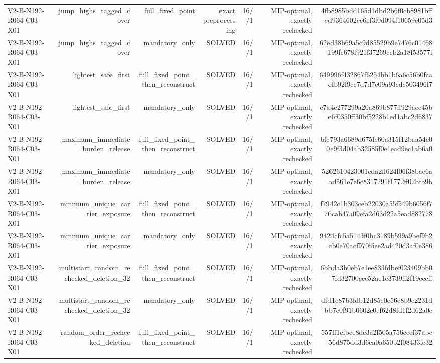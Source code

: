 {\begin{longtable}{lrrrrrr}
V2-B-N192-R064-C03-X01 & jump\_highs\_tagged\_cover & full\_fixed\_point & exact preprocessing & 16//1 & MIP-optimal, exactly rechecked & 4fb8985bdd165d1dbd2b6f0cb8981bffed9364602ce6ef3f0d094f10659e05d3 \\
V2-B-N192-R064-C03-X01 & jump\_highs\_tagged\_cover & mandatory\_only & SOLVED & 16//1 & MIP-optimal, exactly rechecked & 62ed38b69a5c9d85529b9e7476c01468199fc678f921f37269ccb2a18f53577f \\
V2-B-N192-R064-C03-X01 & lightest\_safe\_first & full\_fixed\_point\_then\_reconstruct & SOLVED & 16//1 & MIP-optimal, exactly rechecked & 649996f432867f6254bb1b6a6c56b0fcacfb92f9cc7d7d7e09a93cdc503496f7 \\
V2-B-N192-R064-C03-X01 & lightest\_safe\_first & mandatory\_only & SOLVED & 16//1 & MIP-optimal, exactly rechecked & c7a4c277299a20a869b877ff929aee45be6f0350ff30bf5228b1ed1abc2d6837 \\
V2-B-N192-R064-C03-X01 & maximum\_immediate\_burden\_release & full\_fixed\_point\_then\_reconstruct & SOLVED & 16//1 & MIP-optimal, exactly rechecked & bfc793a6689d675fc60a315f12baa54c00e9f3d04ab32585f0e1ead9ec1ab6a0 \\
V2-B-N192-R064-C03-X01 & maximum\_immediate\_burden\_release & mandatory\_only & SOLVED & 16//1 & MIP-optimal, exactly rechecked & 5262610423001eda2ff624f06f38bac6aad561e7e6c8317291f1772ff02bfb9b \\
V2-B-N192-R064-C03-X01 & minimum\_unique\_carrier\_exposure & full\_fixed\_point\_then\_reconstruct & SOLVED & 16//1 & MIP-optimal, exactly rechecked & f7942c1b303ceb22030a55f549b6056f776cab47a09efa2d63d22a5ead882778 \\
V2-B-N192-R064-C03-X01 & minimum\_unique\_carrier\_exposure & mandatory\_only & SOLVED & 16//1 & MIP-optimal, exactly rechecked & 9424cfc5a5143f0bc3189b599a9bef9b2cb0e70acf970f5ee2ad420d3af0e386 \\
V2-B-N192-R064-C03-X01 & multistart\_random\_rechecked\_deletion\_32 & full\_fixed\_point\_then\_reconstruct & SOLVED & 16//1 & MIP-optimal, exactly rechecked & 6bbda3b0eb7e1ee833fdbef023409bb07fd32700ccc52ae1e3739ff2f19eccff \\
V2-B-N192-R064-C03-X01 & multistart\_random\_rechecked\_deletion\_32 & mandatory\_only & SOLVED & 16//1 & MIP-optimal, exactly rechecked & dfd1e87b3fdb12d85e0e56e8b9e2231dbb7c0f91b0602e0ef62d8fd1f2d62a0e \\
V2-B-N192-R064-C03-X01 & random\_order\_rechecked\_deletion & full\_fixed\_point\_then\_reconstruct & SOLVED & 16//1 & MIP-optimal, exactly rechecked & 557ff1efbee8de3a2f505a756ceef37abc56d875dd3d6ea0a650b2f08433fe32 \\

\end{longtable}}
